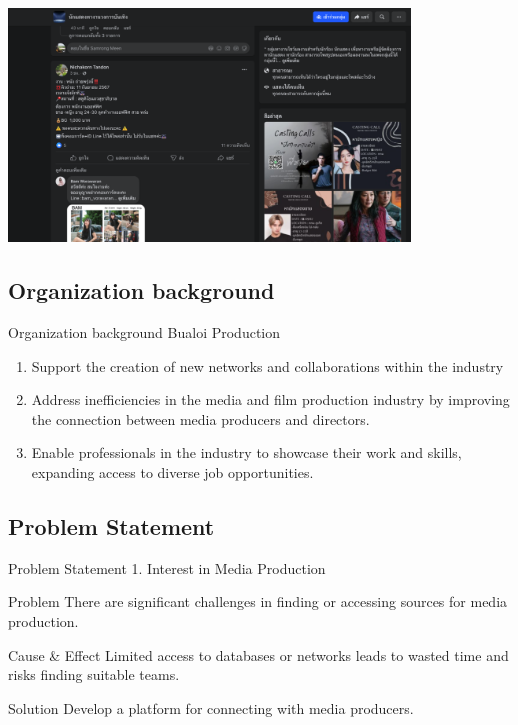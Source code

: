 \documentclass[aspectratio=169]{beamer}
\begin{document}
\begin{frame}
    \centering
    \includegraphics[width=0.8\textwidth]{example1.png}
\end{frame}

\subsection{Organization background}

\begin{frame}{Organization background}
    Bualoi Production
    \begin{enumerate}
        \item Support the creation of new networks and collaborations within the industry
        \item Address inefficiencies in the media and film production industry by improving the connection between media producers and directors.
        \item Enable professionals in the industry to showcase their work and skills, expanding access to diverse job opportunities.
    \end{enumerate}
\end{frame}

\subsection{Problem Statement}

\begin{frame}{Problem Statement}
    1. Interest in Media Production
    \begin{alertblock}{Problem}
        There are significant challenges in finding or accessing sources for media production.
    \end{alertblock}

    \begin{block}{Cause \& Effect}
        Limited access to databases or networks leads to wasted time and risks finding suitable teams.
    \end{block}

    \begin{exampleblock}{Solution}
        Develop a platform for connecting with media producers.
    \end{exampleblock}
\end{frame}
\end{document}
